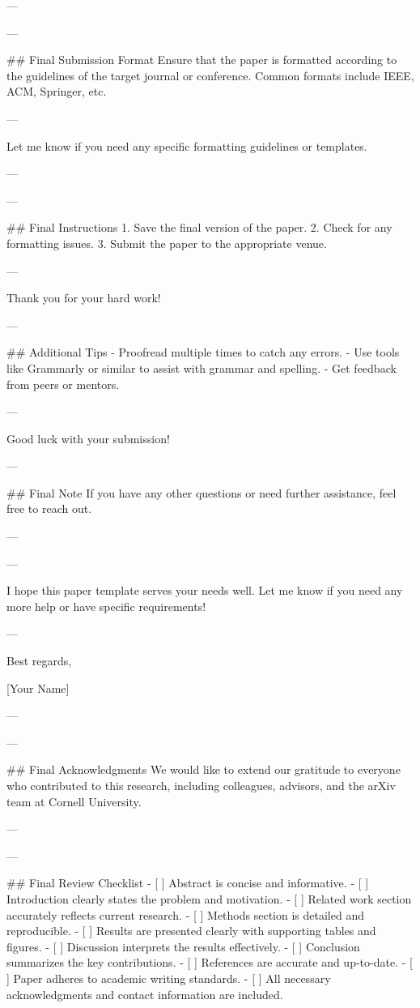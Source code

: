 --- 

---

## Final Submission Format
Ensure that the paper is formatted according to the guidelines of the target journal or conference. Common formats include IEEE, ACM, Springer, etc.

--- 

Let me know if you need any specific formatting guidelines or templates. 

--- 

---

## Final Instructions
1. Save the final version of the paper.
2. Check for any formatting issues.
3. Submit the paper to the appropriate venue.

--- 

Thank you for your hard work! 

--- 

## Additional Tips
- Proofread multiple times to catch any errors.
- Use tools like Grammarly or similar to assist with grammar and spelling.
- Get feedback from peers or mentors.

--- 

Good luck with your submission! 

--- 

## Final Note
If you have any other questions or need further assistance, feel free to reach out. 

--- 

---

I hope this paper template serves your needs well. Let me know if you need any more help or have specific requirements! 

--- 

Best regards, 

[Your Name] 

--- 

---

## Final Acknowledgments
We would like to extend our gratitude to everyone who contributed to this research, including colleagues, advisors, and the arXiv team at Cornell University. 

--- 

---

## Final Review Checklist
- [ ] Abstract is concise and informative.
- [ ] Introduction clearly states the problem and motivation.
- [ ] Related work section accurately reflects current research.
- [ ] Methods section is detailed and reproducible.
- [ ] Results are presented clearly with supporting tables and figures.
- [ ] Discussion interprets the results effectively.
- [ ] Conclusion summarizes the key contributions.
- [ ] References are accurate and up-to-date.
- [ ] Paper adheres to academic writing standards.
- [ ] All necessary acknowledgments and contact information are included.

